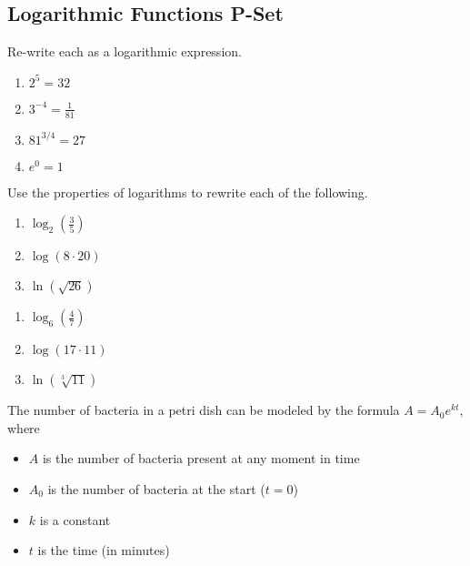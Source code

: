 \documentclass{article}
\newcounter{pset}
\begin{document}
\subsection*{Logarithmic Functions P-Set} 

Re-write each as a logarithmic expression.
\begin{multicols}{4}
\begin{enumerate}
    \item $2^5 = 32$
    \item $3^{-4} = \frac{1}{81}$
    \item $81^{3/4} = 27$
    \item $e^0 = 1$
\end{enumerate}     \setcounter{pset}{\value{enumi}}
\end{multicols}

Use the properties of logarithms to rewrite each of the following.
\begin{multicols}{3}
\begin{enumerate}   \setcounter{enumi}{\value{pset}}
    \item $\log_2\left(\frac{3}{5}\right)$
    \item $\log(8 \cdot 20)$
    \item $\ln\left(\sqrt{26}\right)$
\end{enumerate}     \setcounter{pset}{\value{enumi}}
\end{multicols}
\begin{multicols}{3}
\begin{enumerate}   \setcounter{enumi}{\value{pset}}
    \item $\log_6\left(\frac{4}{7}\right)$
    \item $\log(17 \cdot 11)$
    \item $\ln\left(\sqrt[3]{11}\right)$
\end{enumerate}     \setcounter{pset}{\value{enumi}}
\end{multicols}

The number of bacteria in a petri dish can be modeled by the formula $A = A_0e^{kt}$, where
\begin{itemize}
    \item $A$ is the number of bacteria present at any moment in time
    \item $A_0$ is the number of bacteria at the start ($t=0$)
    \item $k$ is a constant
    \item $t$ is the time (in minutes)
\end{itemize}
\end{document}
